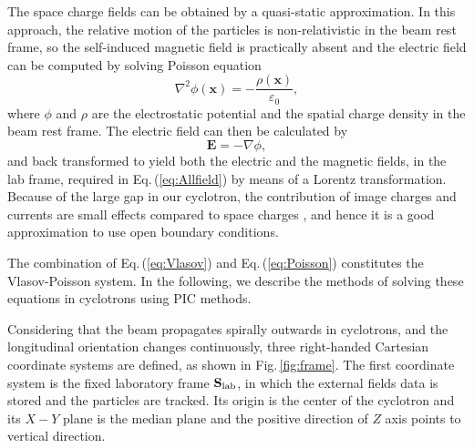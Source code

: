 \documentclass[aps,prstab,twocolumn,superscriptaddress,showpacs]{revtex4}
\newcommand{\bs}[1]{\mathbf #1}
\begin{document}
The space charge fields can be obtained
by a quasi-static approximation. In this approach, the relative motion of the particles is non-relativistic in the beam rest frame, so the self-induced magnetic field is practically absent and the electric field can be computed by solving Poisson equation
\begin{equation}\label{eq:Poisson}
  \nabla^{2} \phi(\bs{x}) = - \frac{\rho(\bs{x})}{\varepsilon_0},
\end{equation}
where $\phi$ and $\rho$ are the electrostatic potential and the spatial charge density in the beam rest frame. The electric field can then be calculated by
\begin{equation}\label{eq:Efield}
  \bs{E}=-\nabla\phi,
\end{equation}
and back transformed to yield both the electric and the magnetic fields, in the lab frame, required in Eq.\,(\ref{eq:Allfield}) by means of a Lorentz transformation.
Because of the large gap in our cyclotron, the contribution of image charges and currents are small effects compared to space charges \cite{Baartman:1}, and hence it is a good approximation to use 
open boundary conditions. 

The combination of Eq.\,(\ref{eq:Vlasov}) and Eq.\,(\ref{eq:Poisson}) constitutes the Vlasov-Poisson system. 
In the following, we describe the methods of solving these equations in cyclotrons using PIC methods.

Considering that the beam propagates spirally outwards in cyclotrons, and the longitudinal orientation changes continuously,
three right-handed Cartesian coordinate systems are defined, as shown in Fig.\,\ref{fig:frame}.  
The first coordinate system is the fixed laboratory frame ${\bs{S}_{\RM{lab}}}$, in which the external fields data is stored and the particles are tracked. 
Its origin is the center of the cyclotron and its $X-Y$ plane is the median plane and the positive direction of $Z$ axis points to vertical direction.
\end{document}
